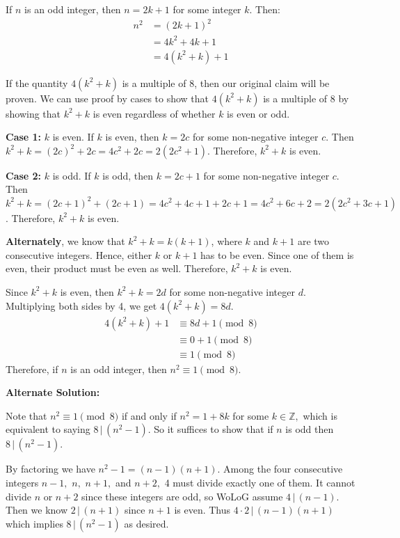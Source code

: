 \documentclass[12pt]{exam}
\begin{document}
\begin{solution}
If $n$ is an odd integer, then $n = 2k+1$ for some integer $k$. Then:
\begin{align*}
    n^2 &= (2k+1)^2\\
        &= 4k^2+ 4k + 1\\
        &= 4(k^2 + k) + 1
\end{align*}

If the quantity $4(k^2 + k)$ is a multiple of $8$, then our original claim will be proven. We can use proof by cases to show that $4(k^2 + k)$ is a multiple of $8$ by showing that $k^2 + k$ is even regardless of whether $k$ is even or odd.

\textbf{Case 1:} $k$ is even. If $k$ is even, then $k = 2c$ for some non-negative integer $c$. Then $k^2 + k = (2c)^2 + 2c = 4c^2 + 2c = 2(2c^2 + 1)$. Therefore, $k^2 + k$ is even.

\textbf{Case 2:} $k$ is odd. If $k$ is odd, then $k = 2c + 1$ for some non-negative integer $c$. Then $k^2 + k = (2c + 1)^2 + (2c + 1) = 4c^2 + 4c + 1 + 2c + 1 = 4c^2 + 6c + 2 = 2(2c^2 + 3c + 1)$. Therefore, $k^2 + k$ is even.

\textbf{Alternately}, we know that $k^2 + k = k(k+1)$, where $k$ and $k+1$ are two consecutive integers. Hence, either $k$ or $k+1$ has to be even. Since one of them is even, their product must be even as well. Therefore, $k^2 + k$ is even.

Since $k^2 + k$ is even, then $k^2 + k = 2d$ for some non-negative integer $d$. Multiplying both sides by 4, we get $4(k^2 + k) = 8d$.
\begin{align*}
    4(k^2 + k) + 1 &\equiv 8d + 1 \pmod 8\\
        &\equiv 0 + 1 \pmod 8 \\
        &\equiv 1 \pmod 8
\end{align*}
Therefore, if $n$ is an odd integer, then $n^2 \equiv 1 \pmod 8.$

\textbf{Alternate Solution:}

Note that $n^2\equiv 1\pmod{8}$ if and only if $n^2=1+8k$ for some $k\in\mathbb{Z},$ which is equivalent to saying $8\,|\,(n^2-1).$ So it suffices to show that if $n$ is odd then $8\,|\,(n^2-1).$

By factoring we have $n^2-1=(n-1)(n+1).$ Among the four consecutive integers $n-1,$ $n,$ $n+1,$ and $n+2,$ 4 must divide exactly one of them. It cannot divide $n$ or $n+2$ since these integers are odd, so WoLoG assume $4\,|\,(n-1).$ Then we know $2\,|\,(n+1)$ since $n+1$ is even. Thus $4\cdot 2 \,|\, (n-1)(n+1)$ which implies $8\,|\,(n^2-1)$ as desired.


\end{solution}
\end{document}
